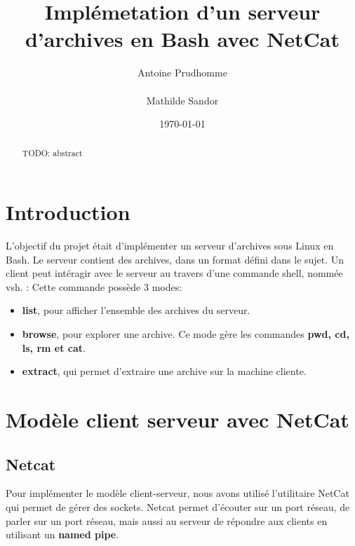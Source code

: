 \documentclass[titlepage]{article}
\begin{document}
	\title{Implémetation d'un serveur d'archives en Bash avec NetCat}
	\author{Antoine Prudhomme \\ \\ Mathilde Sandor}
	\date{\today}

	\maketitle

	\begin{abstract}
		TODO: abstract 
	\end{abstract}

	\section{Introduction}
	L'objectif du projet était d'implémenter un serveur d'archives sous Linux en Bash.
	Le serveur contient des archives, dans un format défini dans le sujet. 
	Un client peut intéragir avec le serveur au travers d'une commande shell, nommée vsh. :
	Cette commande possède 3 modes:
	\begin{itemize}  
	\item \textbf{list}, pour afficher l'ensemble des archives du serveur.
	\item \textbf{browse}, pour explorer une archive. Ce mode gère les commandes \textbf{pwd, cd, ls, rm et cat}.
	\item \textbf{extract}, qui permet d'extraire une archive sur la machine cliente.
	\end{itemize}   


	\section{Modèle client serveur avec NetCat}
	
	\subsection{Netcat} 
	Pour implémenter le modèle client-serveur, nous avons utilisé l'utilitaire NetCat qui permet de gérer des sockets.
	Netcat permet d'écouter sur un port réseau, de parler sur un port réseau, mais aussi au serveur de répondre aux clients en utilisant un \textbf{named pipe}.
\end{document}
